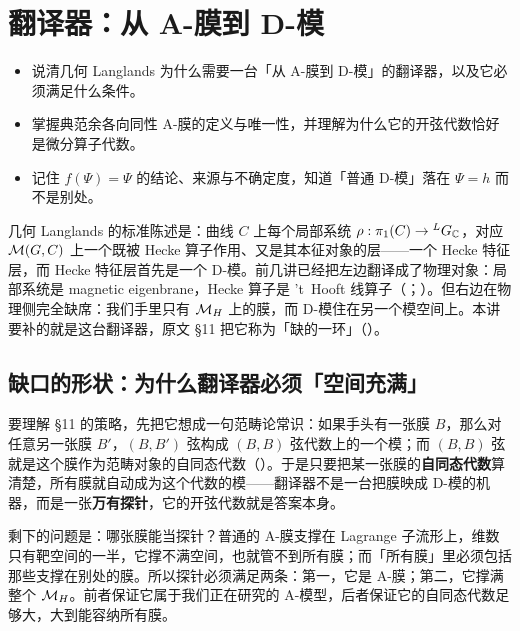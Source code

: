 
\section{翻译器：从 A-膜到 D-模}
\label{sec:dmod}

\begin{goals}
\begin{itemize}
\item 说清几何 Langlands 为什么需要一台「从 A-膜到 D-模」的翻译器，以及它必须满足什么条件。
\item 掌握典范余各向同性 A-膜的定义与唯一性，并理解为什么它的开弦代数恰好是微分算子代数。
\item 记住 $f(\Psi)=\Psi$ 的结论、来源与不确定度，知道「普通 D-模」落在 $\Psi=h$ 而不是别处。
\end{itemize}
\end{goals}

几何 Langlands 的标准陈述是：曲线 $C$ 上每个局部系统 $\rho:\pi_1(C)\to{}^{L}G_{\mathbb{C}}$，对应 $\mathcal{M}(G,C)$ 上一个既被 Hecke 算子作用、又是其本征对象的层——一个 Hecke 特征层，而 Hecke 特征层首先是一个 D-模。前几讲已经把左边翻译成了物理对象：局部系统是 magnetic eigenbrane，Hecke 算子是 't~Hooft 线算子（\cite{kw06}；）。但右边在物理侧完全缺席：我们手里只有 $\mathcal{M}_{H}$ 上的膜，而 D-模住在另一个模空间上。本讲要补的就是这台翻译器，原文 \S11 把它称为「缺的一环」（）。

\subsection{缺口的形状：为什么翻译器必须「空间充满」}

要理解 \S11 的策略，先把它想成一句范畴论常识：如果手头有一张膜 $B$，那么对任意另一张膜 $B'$，$(B,B')$ 弦构成 $(B,B)$ 弦代数上的一个模；而 $(B,B)$ 弦就是这个膜作为范畴对象的自同态代数（）。于是只要把某一张膜的\textbf{自同态代数}算清楚，所有膜就自动成为这个代数的模——翻译器不是一台把膜映成 D-模的机器，而是一张\textbf{万有探针}，它的开弦代数就是答案本身。

剩下的问题是：哪张膜能当探针？普通的 A-膜支撑在 Lagrange 子流形上，维数只有靶空间的一半，它撑不满空间，也就管不到所有膜；而「所有膜」里必须包括那些支撑在别处的膜。所以探针必须满足两条：第一，它是 A-膜；第二，它撑满整个 $\mathcal{M}_{H}$。前者保证它属于我们正在研究的 A-模型，后者保证它的自同态代数足够大，大到能容纳所有膜。

